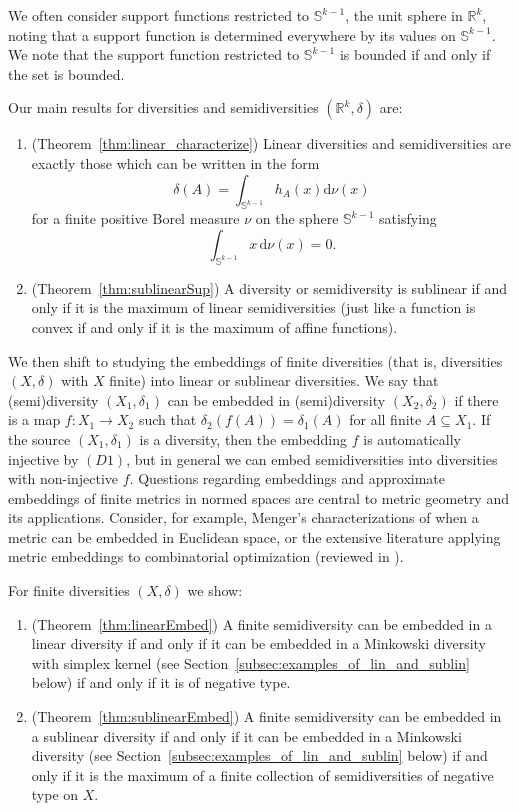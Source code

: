 \documentclass[11pt]{article}
\newcommand{\bbS}{\mathbb{S}}
\renewcommand{\Re}{\mathbb{R}}
\begin{document}
    We often consider support functions restricted to $\bbS^{k-1}$, the unit sphere in $\Re^k$, noting that a support function is determined everywhere by its values on $\bbS^{k-1}$.
We note that the support function restricted to  $\bbS^{k-1}$ is bounded if and only if the set is bounded. 




Our main results for diversities and semidiversities $(\Re^k,\delta)$ are:
\begin{enumerate}
\item (Theorem~\ref{thm:linear_characterize}) Linear diversities and semidiversities are exactly those which can be written in the form
\[ \delta(A) = \int_{\bbS^{k-1}} h_A(x) \mathrm{d}\nu(x) \]
for a finite positive Borel measure $\nu$ on the sphere $\bbS^{k-1}$ satisfying 
\begin{equation} 
    \int_{\bbS^{k-1}} x \, \mathrm{d}\nu(x) = 0.
\end{equation} 
\item (Theorem~\ref{thm:sublinearSup}) A diversity or semidiversity is sublinear if and only if it is the maximum of linear semidiversities (just like a function is convex if and only if it is the maximum of affine functions). 
\end{enumerate}

We then shift to studying the embeddings of finite diversities (that is,  diversities $(X,\delta)$ with $X$ finite) into linear or sublinear diversities.   
We say that (semi)diversity $(X_1,\delta_1)$ can be embedded in (semi)diversity $(X_2,\delta_2)$ if there is a map $f \colon X_1 \rightarrow X_2$ such that $\delta_2(f(A)) = \delta_1(A)$ for all finite $A \subseteq X_1$. If the source $(X_1,\delta_1)$ is a diversity, then the embedding $f$ is automatically injective by $(D1)$, but in general we can embed semidiversities into diversities  with non-injective $f$.
Questions regarding embeddings and approximate embeddings of finite metrics in normed spaces are central to metric geometry and its applications. Consider, for example, Menger's characterizations of when a metric can be embedded in Euclidean space, or the extensive literature applying metric embeddings to combinatorial optimization (reviewed in \cite{DezaLaurent97,matousek2013lectures,indyk20178}). 

For finite diversities $(X,\delta)$ we show:
\begin{enumerate}
\item (Theorem~\ref{thm:linearEmbed}) A finite semidiversity can be embedded in a linear diversity if and only if it can be embedded in a Minkowski diversity with simplex kernel (see Section~\ref{subsec:examples_of_lin_and_sublin} below) if and only if it is of negative type.
\item (Theorem~\ref{thm:sublinearEmbed}) A finite semidiversity  can be embedded in a sublinear diversity if and only if it can be embedded in a Minkowski diversity 
(see Section~\ref{subsec:examples_of_lin_and_sublin} below) if and only if 
it is the maximum of a finite collection of  semidiversities of negative type  on $X$.
\end{enumerate}
\end{document}
